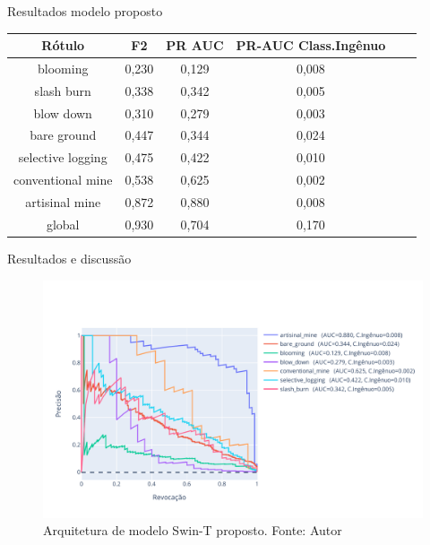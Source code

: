 \documentclass{beamer}
\begin{document}
\begin{frame}{Resultados modelo proposto}
    \fontsize{7pt}{8pt}\selectfont
    \centering    
    \begin{tabular}{*{6}{c}}
        \hline
                     Rótulo &  F2    &   PR AUC &  PR-AUC Class.Ingênuo \\
        \hline
                  blooming &  0,230 &    0,129 &       0,008 \\
                slash burn &  0,338 &    0,342 &       0,005 \\
                 blow down &  0,310 &    0,279 &       0,003 \\
               bare ground &  0,447 &    0,344 &       0,024 \\
         selective logging &  0,475 &    0,422 &       0,010 \\
         conventional mine &  0,538 &    0,625 &       0,002 \\
            artisinal mine &  0,872 &    0,880 &       0,008 \\
                    global &  0,930 &    0,704 &       0,170 \\
        \hline
    \end{tabular}
\end{frame}     


\begin{frame}{Resultados e discussão}
    \begin{figure}[!ht]
        \centering
        \includegraphics[width=\columnwidth]{Imagens/results/rsp-swin-t_planet_pt/Curva PR para classes raras.pdf}
        \caption{ Arquitetura de modelo Swin-T proposto.
        Fonte: Autor}
        \label{fig:CurvaPRSwint}
    \end{figure}       
\end{frame}  
\end{document}
